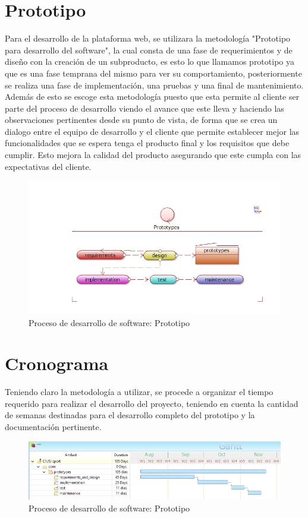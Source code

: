 \section{Prototipo}
Para el desarrollo de la plataforma web, se utilizara la metodología "Prototipo para desarrollo del software", la cual consta de una fase de requerimientos y de diseño con la creación de un subproducto, es esto lo que llamamos prototipo ya que es una fase temprana del mismo para ver su comportamiento, posteriormente se realiza una fase de implementación, una pruebas y una final de mantenimiento.
\newline
Además de esto se escoge esta metodología puesto que esta permite al cliente ser parte del proceso de desarrollo viendo el avance que este lleva y haciendo las observaciones pertinentes desde su punto de vista, de forma que se crea un dialogo entre el equipo de desarrollo y el cliente que permite establecer mejor las funcionalidades que se espera tenga el producto final y los requisitos que debe cumplir. Esto mejora la calidad del producto asegurando que este cumpla con las expectativas del cliente.
\begin{figure}[th!]
	\centering
	\includegraphics[width=0.9\linewidth]{imagenes/Proceso1}
	\caption{Proceso de desarrollo de software: Prototipo}
\end{figure}

\newpage

\section{Cronograma}

Teniendo claro la metodología a utilizar, se procede a organizar el tiempo requerido para realizar el desarrollo del proyecto, teniendo en cuenta la cantidad de semanas destinadas para el desarrollo completo del prototipo y la documentación pertinente.

\begin{figure}[th!]
	\centering
	\includegraphics[width=0.9\linewidth]{imagenes/cronograma}
	\caption{Proceso de desarrollo de software: Prototipo}
\end{figure}


\newpage